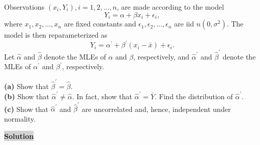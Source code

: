 \documentclass[12pt]{article}
\newcommand{\mybox}{%
    \collectbox{%
        \setlength{\fboxsep}{2pt}%
        \fbox{\BOXCONTENT}%
    }%
}
\begin{document}
\noindent Observations $(x_i, Y_i), i = 1, 2, \ldots, n$, are made according to the model $$Y_i = \alpha + \beta x_i + \epsilon_i,$$ where $x_1, x_2, \ldots, x_n$ are fixed constants and $\epsilon_1, \epsilon_2, \ldots, \epsilon_n$ are iid $n(0, \sigma^2)$. The model is then reparameterized as $$Y_i = \alpha^{\prime} + \beta^{\prime}(x_i-\bar{x})+\epsilon_i.$$ Let $\hat{\alpha}$ and $\hat{\beta}$ denote the MLEs of $\alpha$ and $\beta$, respectively, and $\hat{\alpha}^{\prime}$ and $\hat{\beta}^{\prime}$ denote the MLEs of $\alpha^{\prime}$ and $\beta^{\prime}$, respectively.
\begin{flushleft}
\textbf{(a)} Show that $\hat{\beta}^{\prime} = \hat{\beta}.$ \\
\textbf{(b)} Show that $\hat{\alpha}^{\prime} \neq \hat{\alpha}$. In fact, show that $\hat{\alpha}^{\prime} = \bar{Y}$. Find the distribution of $\hat{\alpha}^{\prime}.$ \\
\textbf{(c)} Show that $\hat{\alpha}^{\prime}$ and $\hat{\beta}^{\prime}$ are uncorrelated and, hence, independent under normality.
\end{flushleft}

\noindent\mybox{\colorbox{lightgray}{\textbf{Solution}}} \hspace{3mm}\hrulefill
\end{document}

